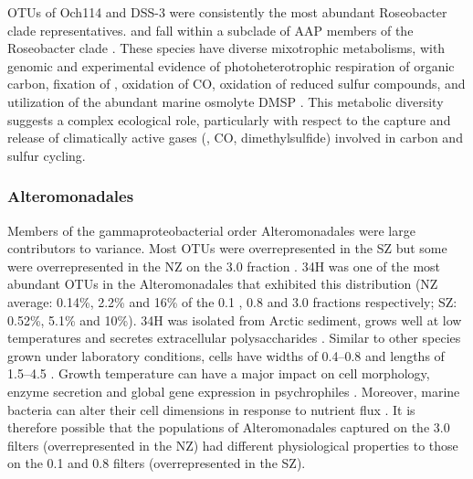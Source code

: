 \acp{OTU} of  Och114 and  DSS-3 were consistently the most abundant Roseobacter clade representatives.
 and  fall within a subclade of \ac{AAP} members of the Roseobacter clade \cite{Swingley:2007dm}.
These species have diverse mixotrophic metabolisms, with genomic and experimental evidence of photoheterotrophic respiration of organic carbon, fixation of , oxidation of CO, oxidation of reduced sulfur compounds, and utilization of the abundant marine osmolyte \ac{DMSP} \cite{King:2003kc,Moran:2004ie,WagnerDobler:2006kb,Swingley:2007dm,Brinkhoff:2008do,Howard:2008hf}.
This metabolic diversity suggests a complex ecological role, particularly with respect to the capture and release of climatically active gases (, CO, dimethylsulfide) involved in carbon and sulfur cycling.

\subsubsection{Alteromonadales}

Members of the gammaproteobacterial order Alteromonadales were large contributors to variance.
Most \acp{OTU} were overrepresented in the \ac{SZ} but some were overrepresented in the \ac{NZ} on the 3.0 \micron{} fraction .
 34H was one of the most abundant \acp{OTU} in the Alteromonadales that exhibited this distribution (\ac{NZ} average: 0.14\%, 2.2\% and 16\% of the 0.1 \micron{}, 0.8 \micron{} and 3.0 \micron{} fractions respectively; \ac{SZ}: 0.52\%, 5.1\% and 10\%).
 34H was isolated from Arctic sediment, grows well at low temperatures and secretes extracellular polysaccharides \cite{Huston:2000jr,Junge:2003kb,Methe:2005uf}.
Similar to other  species grown under laboratory conditions, cells have widths of 0.4--0.8 \micron{} and lengths of 1.5--4.5 \micron{} \cite{Jung:2006fh}.
Growth temperature can have a major impact on cell morphology, enzyme secretion and global gene expression in psychrophiles \citep[e.g.][]{Feller:2003ir,Junge:2003kb,Williams:2011hy,Cavicchioli:2006bl,Campanaro:2011gj}.
Moreover, marine bacteria can alter their cell dimensions in response to nutrient flux \citep[e.g.][]{Kjelleberg:1987wp}.
It is therefore possible that the populations of Alteromonadales captured on the 3.0 \micron{} filters (overrepresented in the \ac{NZ}) had different physiological properties to those on the 0.1 and 0.8 \micron{} filters (overrepresented in the \ac{SZ}).

